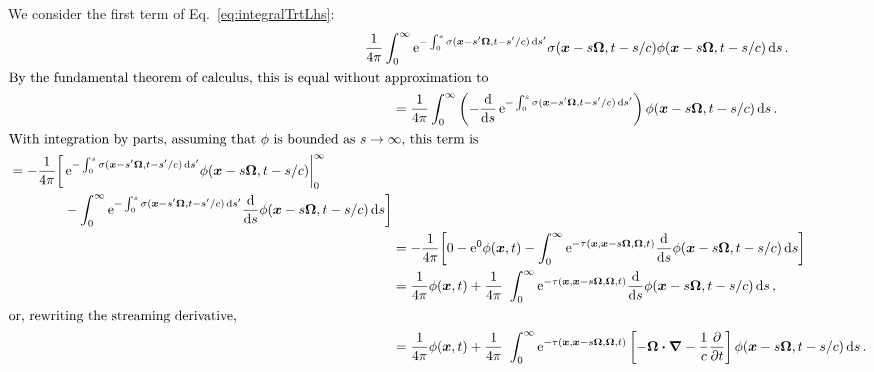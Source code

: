 \documentclass[11pt,letter,twoside]{mc2011}
\begin{document}
We consider the first term of Eq.~\eqref{eq:integralTrtLhs}: 
\begin{align*}
\lefteqn{\frac{1}{4\pi}\int_{0}^{\infty} \eexp^{ -\int_{0}^{s}
  \sigma(\vec{x}-s'\vec{\Omega}, t-s'/c) \ud s'} \sigma(\vec{x} - s \vec{\Omega}, t-s/c)
\phi(\vec{x} - s \vec{\Omega}, t-s/c) \ud s \,.}\qquad&
\\ 
\intertext{By the fundamental theorem of calculus, this is equal without
approximation to}
&=\frac{1}{4\pi}\int_{0}^{\infty} \left( - \oder{}{s} \eexp^{ -\int_{0}^{s}
  \sigma(\vec{x}-s'\vec{\Omega}, t-s'/c) \ud s'}\right)
\phi(\vec{x} - s \vec{\Omega}, t-s/c) \ud s\,.
\\
\intertext{With integration by parts, assuming that $\phi$ is bounded as
$s\to\infty$, this term is}
    \begin{split}
  &=-\frac{1}{4\pi} \bigg[ 
\eexp^{- \int_{0}^{s} \sigma(\vec{x}-s'\vec{\Omega}, t-s'/c) \ud s'} 
\phi(\vec{x} - s \vec{\Omega}, t-s/c) \bigg|_{0}^{\infty}
\\
&\qquad\qquad- \int_{0}^{\infty} \eexp^{- \int_{0}^{s} \sigma(\vec{x}-s'\vec{\Omega}, t-s'/c) \ud s'}
\oder{}{s} \phi(\vec{x} - s \vec{\Omega}, t-s/c)
\ud s
  \bigg]
    \end{split}
  \\
  &=-\frac{1}{4\pi} \bigg[ 
0 -  
\eexp^0 \phi(\vec{x}, t)
- \int_{0}^{\infty} \eexp^{-\tau(\vec{x}, \vec{x} - s \vec{\Omega}, \vec{\Omega}, t)}
\oder{}{s} \phi(\vec{x} - s \vec{\Omega}, t-s/c)
\ud s
  \bigg]
  \\
 &=\frac{1}{4\pi}\phi(\vec{x}, t)
+ \frac{1}{4\pi}\ \int_{0}^{\infty} \eexp^{-\tau(\vec{x}, \vec{x} - s \vec{\Omega}, \vec{\Omega}, t)}
\oder{}{s} \phi(\vec{x} - s \vec{\Omega}, t-s/c)
\ud s\,,
 \\
 \intertext{or, rewriting the streaming derivative,}
 &=\frac{1}{4\pi}\phi(\vec{x}, t)
+ \frac{1}{4\pi}\ \int_{0}^{\infty} \eexp^{-\tau(\vec{x}, \vec{x} - s
\vec{\Omega}, \vec{\Omega}, t)}
\left[ -\vec{\Omega} \vd \del - \frac1c \pder{}{t} \right] \phi(\vec{x} - s \vec{\Omega}, t-s/c)
\ud s\,.
\end{align*}
\end{document}
